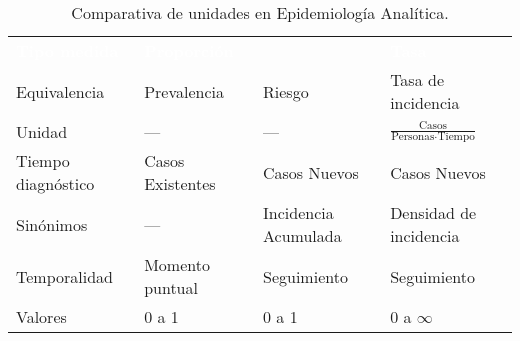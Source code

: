 \begin{table}[H]
	\centering
	\begin{tabular}{M{2.5cm}N{3.5cm}N{3.5cm}N{3.5cm}}
		\textcolor{white}{\textbf{Tipo medida}}&\textcolor{white}{\textbf{Proporción}}&\textcolor{white}{\textbf{}}&\textcolor{white}{\textbf{Tasa}}\\
		Equivalencia&Prevalencia&Riesgo&Tasa de incidencia\\
		Unidad&---&---&$\frac{\mbox{Casos}}{\mbox{Personas}\cdot\mbox{Tiempo}}$\\
		Tiempo diagnóstico&Casos Existentes&Casos Nuevos&Casos Nuevos\\
		Sinónimos&---&Incidencia Acumulada&Densidad de incidencia\\
		Temporalidad&Momento puntual&Seguimiento&Seguimiento\\
		Valores&0 a 1&0 a 1&0 a $\infty$\\
		\hline
	\end{tabular}
	\caption{Comparativa de unidades en Epidemiología Analítica.}
\end{table}